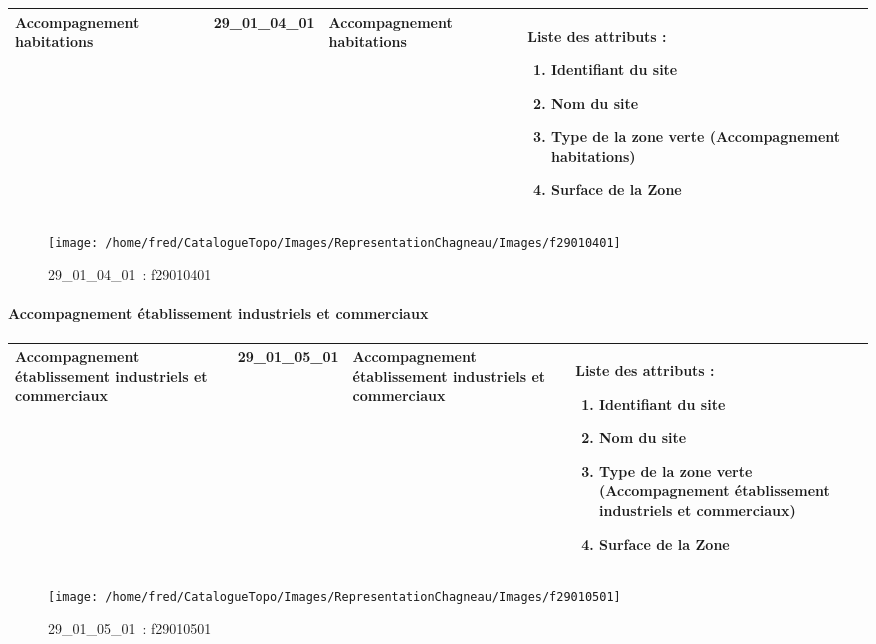 \documentclass[12pt,titlepage]{book}
\begin{document}
\renewcommand{\arraystretch}{1.2}
\begin{supertabular}{|p{10cm}|c|p{13cm}|p{12cm}|}
 Accompagnement habitations & 29\_01\_04\_01 & Accompagnement habitations & Liste des attributs :
\begin{enumerate}
  \item Identifiant du site  \item Nom du site  \item Type de la zone verte (Accompagnement habitations)  \item Surface de la Zone\end{enumerate}
\\
\hline
\end{supertabular}
\begin{figure}[h!]
  \hfill         %
  \begin{minipage}[t]{3cm}
    \begin{center}
      \texttt{[image: /home/fred/CatalogueTopo/Images/RepresentationChagneau/Images/f29010401]}
      \caption[~29\_01\_04\_01]{\small{29\_01\_04\_01~:} \tiny{f29010401}}\label{f29010401}
    \end{center}
  \end{minipage}
\end{figure}


\paragraph{Accompagnement établissement industriels et commerciaux}
\noindent
\vspace{\baselineskip}

\renewcommand{\arraystretch}{1.2}
\begin{supertabular}{|p{10cm}|c|p{13cm}|p{12cm}|}
 Accompagnement établissement industriels et commerciaux & 29\_01\_05\_01 & Accompagnement établissement industriels et commerciaux & Liste des attributs :
\begin{enumerate}
  \item Identifiant du site  \item Nom du site  \item Type de la zone verte (Accompagnement établissement industriels et commerciaux)  \item Surface de la Zone\end{enumerate}
\\
\hline
\end{supertabular}
\begin{figure}[h!]
  \hfill         %
  \begin{minipage}[t]{3cm}
    \begin{center}
      \texttt{[image: /home/fred/CatalogueTopo/Images/RepresentationChagneau/Images/f29010501]}
      \caption[~29\_01\_05\_01]{\small{29\_01\_05\_01~:} \tiny{f29010501}}\label{f29010501}
    \end{center}
  \end{minipage}
\end{figure}
\end{document}
